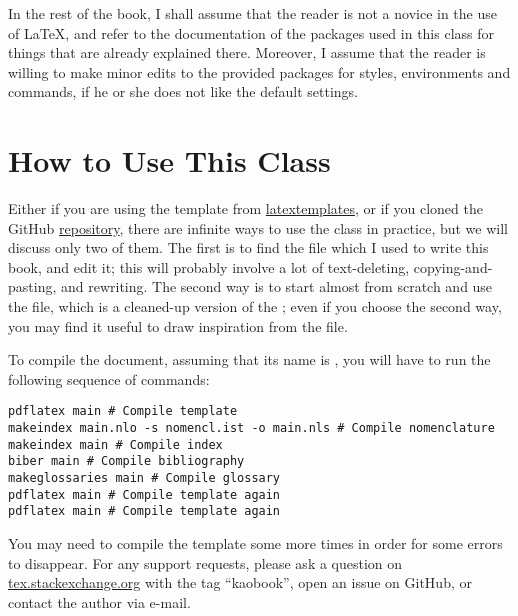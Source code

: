 
In the rest of the book, I shall assume that the reader is not a novice 
in the use of \LaTeX, and refer to the documentation of the packages 
used in this class for things that are already explained there. 
Moreover, I assume that the reader is willing to make minor edits to the 
provided packages for styles, environments and commands, if he or she 
does not like the default settings.

\section{How to Use This Class}

Either if you are using the template from 
\href{http://latextemplates.org/template/kaobook}{latextemplates}, or if 
you cloned the GitHub 
\href{https://www.github.com/fmarotta/kaobook}{repository}, there are 
infinite ways to use the  class in practice, but we will 
discuss only two of them. The first is to find the  file 
which I used to write this book, and edit it; this will probably involve 
a lot of text-deleting, copying-and-pasting, and rewriting. The second 
way is to start almost from scratch and use the  
file, which is a cleaned-up version of the ; even if you 
choose the second way, you may find it useful to draw inspiration from 
the  file.

To compile the document, assuming that its name is , you 
will have to run the following sequence of commands:

\begin{lstlisting}[style=kaolstplain,linewidth=1.5\textwidth]
pdflatex main # Compile template
makeindex main.nlo -s nomencl.ist -o main.nls # Compile nomenclature
makeindex main # Compile index
biber main # Compile bibliography
makeglossaries main # Compile glossary
pdflatex main # Compile template again
pdflatex main # Compile template again
\end{lstlisting}

You may need to compile the template some more times in order for some 
errors to disappear. For any support requests, please ask a question on 
\url{tex.stackexchange.org} with the tag \enquote{kaobook}, open an 
issue on GitHub, or contact the author via e-mail.
